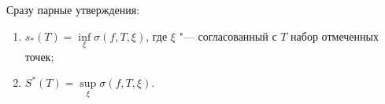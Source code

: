 \label{RRRR}
 	Сразу парные утверждения:
 	
 	\begin{enumerate}
 	  \item $s_*(T)=\inf\limits_{\xi}\sigma(f,T,\xi)$, где $\xi$ "--- согласованный с $T$ набор отмеченных точек;
 	  \item $S^*(T)=\sup\limits_{\xi}\sigma(f,T,\xi)$.
 	\end{enumerate}
 